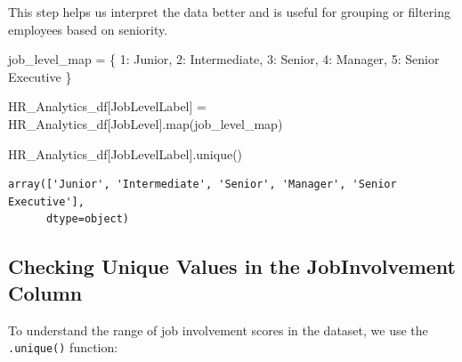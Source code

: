 \documentclass[
  letterpaper,
  DIV=11,
  numbers=noendperiod]{scrartcl}
\newenvironment{Shaded}{\begin{snugshade}}{\end{snugshade}}
\newcommand{\BuiltInTok}[1]{\textcolor[rgb]{0.00,0.23,0.31}{#1}}
\newcommand{\DecValTok}[1]{\textcolor[rgb]{0.68,0.00,0.00}{#1}}
\newcommand{\NormalTok}[1]{\textcolor[rgb]{0.00,0.23,0.31}{#1}}
\newcommand{\OperatorTok}[1]{\textcolor[rgb]{0.37,0.37,0.37}{#1}}
\newcommand{\StringTok}[1]{\textcolor[rgb]{0.13,0.47,0.30}{#1}}
\begin{document}
This step helps us interpret the data better and is useful for grouping
or filtering employees based on seniority.

\begin{Shaded}
\begin{Highlighting}[]
\NormalTok{job\_level\_map }\OperatorTok{=}\NormalTok{ \{}
    \DecValTok{1}\NormalTok{: }\StringTok{\textquotesingle{}Junior\textquotesingle{}}\NormalTok{,}
    \DecValTok{2}\NormalTok{: }\StringTok{\textquotesingle{}Intermediate\textquotesingle{}}\NormalTok{,}
    \DecValTok{3}\NormalTok{: }\StringTok{\textquotesingle{}Senior\textquotesingle{}}\NormalTok{,}
    \DecValTok{4}\NormalTok{: }\StringTok{\textquotesingle{}Manager\textquotesingle{}}\NormalTok{,}
    \DecValTok{5}\NormalTok{: }\StringTok{\textquotesingle{}Senior Executive\textquotesingle{}}
\NormalTok{\}}
\end{Highlighting}
\end{Shaded}

\begin{Shaded}
\begin{Highlighting}[]
\NormalTok{HR\_Analytics\_df[}\StringTok{\textquotesingle{}JobLevelLabel\textquotesingle{}}\NormalTok{] }\OperatorTok{=}\NormalTok{ HR\_Analytics\_df[}\StringTok{\textquotesingle{}JobLevel\textquotesingle{}}\NormalTok{].}\BuiltInTok{map}\NormalTok{(job\_level\_map)}
\end{Highlighting}
\end{Shaded}

\begin{Shaded}
\begin{Highlighting}[]
\NormalTok{HR\_Analytics\_df[}\StringTok{\textquotesingle{}JobLevelLabel\textquotesingle{}}\NormalTok{].unique()}
\end{Highlighting}
\end{Shaded}

\begin{verbatim}
array(['Junior', 'Intermediate', 'Senior', 'Manager', 'Senior Executive'],
      dtype=object)
\end{verbatim}

\subsection{Checking Unique Values in the JobInvolvement
Column}\label{checking-unique-values-in-the-jobinvolvement-column}

To understand the range of job involvement scores in the dataset, we use
the \texttt{.unique()} function:
\end{document}
